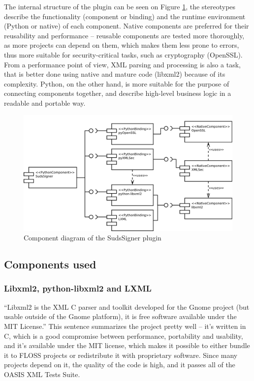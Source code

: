 The internal structure of the plugin can be seen on Figure \ref{fig:cmpdSudsSigner}, the stereotypes describe the functionality (component or binding) and the runtime environment (Python or native) of each component. Native components are preferred for their reusability and performance -- reusable components are tested more thoroughly, as more projects can depend on them, which makes them less prone to errors, thus more suitable for security-critical tasks, such as cryptography (OpenSSL). From a performance point of view, XML parsing and processing is also a task, that is better done using native and mature code (libxml2) because of its complexity. Python, on the other hand, is more suitable for the purpose of connecting components together, and describe high-level business logic in a readable and portable way.

\begin{figure}[htbp]
 \centering
 \includegraphics[width=\textwidth]{images/cmpdSudsSigner.pdf}
 \caption{Component diagram of the SudsSigner plugin}
 \label{fig:cmpdSudsSigner}
\end{figure}

\subsection{Components used}

\subsubsection{Libxml2, python-libxml2 and LXML}

``Libxml2 is the XML C parser and toolkit developed for the Gnome project (but usable outside of the Gnome platform), it is free software available under the MIT License.''\cite{libxml2-homepage} This sentence summarizes the project pretty well -- it's written in C, which is a good compromise between performance, portability and usability, and it's available under the MIT license, which makes it possible to either bundle it to FLOSS projects or redistribute it with proprietary software. Since many projects depend on it, the quality of the code is high, and it passes all of the OASIS XML Tests Suite.

